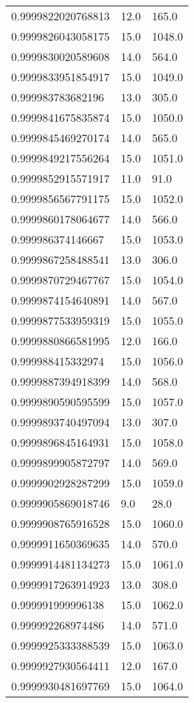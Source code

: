 \begin{center}
\begin{supertabular}[H]{p{0.30\textwidth}p{0.05\textwidth}p{0.05\textwidth}}
0.9999822020768813 & 12.0 & 165.0 \\ 
0.9999826043058175 & 15.0 & 1048.0 \\ 
0.9999830020589608 & 14.0 & 564.0 \\ 
0.9999833951854917 & 15.0 & 1049.0 \\ 
0.999983783682196 & 13.0 & 305.0 \\ 
0.9999841675835874 & 15.0 & 1050.0 \\ 
0.9999845469270174 & 14.0 & 565.0 \\ 
0.9999849217556264 & 15.0 & 1051.0 \\ 
0.9999852915571917 & 11.0 & 91.0 \\ 
0.9999856567791175 & 15.0 & 1052.0 \\ 
0.9999860178064677 & 14.0 & 566.0 \\ 
0.999986374146667 & 15.0 & 1053.0 \\ 
0.9999867258488541 & 13.0 & 306.0 \\ 
0.9999870729467767 & 15.0 & 1054.0 \\ 
0.9999874154640891 & 14.0 & 567.0 \\ 
0.9999877533959319 & 15.0 & 1055.0 \\ 
0.9999880866581995 & 12.0 & 166.0 \\ 
0.999988415332974 & 15.0 & 1056.0 \\ 
0.9999887394918399 & 14.0 & 568.0 \\ 
0.9999890590595599 & 15.0 & 1057.0 \\ 
0.9999893740497094 & 13.0 & 307.0 \\ 
0.9999896845164931 & 15.0 & 1058.0 \\ 
0.9999899905872797 & 14.0 & 569.0 \\ 
0.9999902928287299 & 15.0 & 1059.0 \\ 
0.9999905869018746 & 9.0 & 28.0 \\ 
0.9999908765916528 & 15.0 & 1060.0 \\ 
0.9999911650369635 & 14.0 & 570.0 \\ 
0.9999914481134273 & 15.0 & 1061.0 \\ 
0.9999917263914923 & 13.0 & 308.0 \\ 
0.999991999996138 & 15.0 & 1062.0 \\ 
0.999992268974486 & 14.0 & 571.0 \\ 
0.9999925333388539 & 15.0 & 1063.0 \\ 
0.9999927930564411 & 12.0 & 167.0 \\ 
0.9999930481697769 & 15.0 & 1064.0 \\ 

\end{supertabular}
\end{center}

